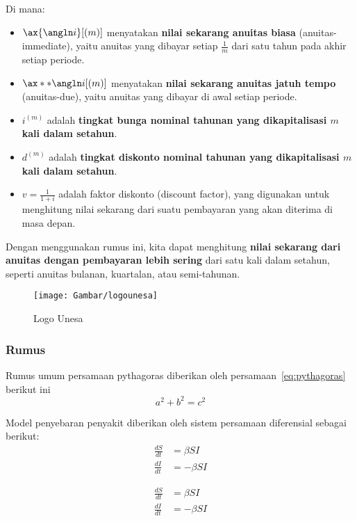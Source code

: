 Di mana:
\begin{itemize}
	\item $\ax{\angln i}[\left(m\right)]$ menyatakan \textbf{nilai sekarang anuitas biasa} (anuitas-immediate), yaitu anuitas yang dibayar setiap \( \frac{1}{m} \) dari satu tahun pada akhir setiap periode.
	\item $\ax**{\angln i}[\left(m\right)]$ menyatakan \textbf{nilai sekarang anuitas jatuh tempo} (anuitas-due), yaitu anuitas yang dibayar di awal setiap periode.
	\item $i^{(m)}$ adalah \textbf{tingkat bunga nominal tahunan yang dikapitalisasi $m$ kali dalam setahun}.
	\item $d^{(m)}$ adalah \textbf{tingkat diskonto nominal tahunan yang dikapitalisasi $m$ kali dalam setahun}.
	\item $v = \frac{1}{1 + i}$ adalah faktor diskonto (discount factor), yang digunakan untuk menghitung nilai sekarang dari suatu pembayaran yang akan diterima di masa depan.
\end{itemize}

Dengan menggunakan rumus ini, kita dapat menghitung \textbf{nilai sekarang dari anuitas dengan pembayaran lebih sering} dari satu kali dalam setahun, seperti anuitas bulanan, kuartalan, atau semi-tahunan.


\begin{figure}[h!]
	\centering
	\texttt{[image: Gambar/logounesa]}
	\caption{Logo Unesa}
	\label{fig:logounesa}
\end{figure}

\subsubsection{Rumus}
Rumus umum persamaan pythagoras diberikan oleh persamaan~\ref{eq:pythagoras} berikut ini
\begin{equation}
	a^2 + b^2 = c^2 \label{eq:pythagoras}
\end{equation}

Model penyebaran penyakit diberikan oleh sistem persamaan diferensial sebagai berikut:
\begin{align}
	\frac{dS}{dt} &= \beta S I\\
	\nonumber \frac{dI}{dt} &= -\beta S I
\end{align}

\begin{equation}
	\begin{aligned}
		\frac{dS}{dt} &= \beta S I\\
		\frac{dI}{dt} &= -\beta S I
	\end{aligned}
\end{equation}

